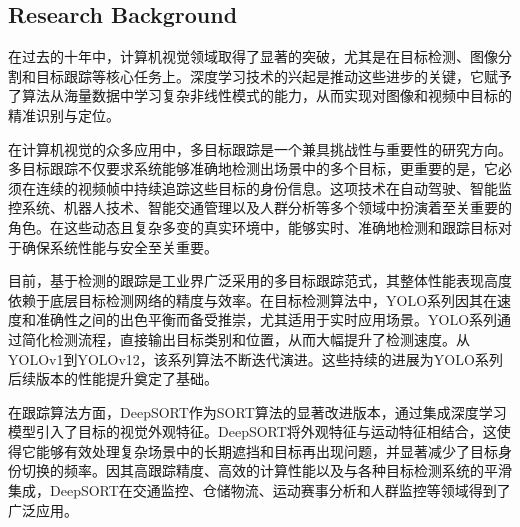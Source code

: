 
\subsection{Research Background}
在过去的十年中，计算机视觉领域取得了显著的突破，尤其是在目标检测、图像分割和目标跟踪等核心任务上。深度学习技术的兴起是推动这些进步的关键，它赋予了算法从海量数据中学习复杂非线性模式的能力，从而实现对图像和视频中目标的精准识别与定位\cite{113}\cite{28_kaur_comprehensive_2023}。

在计算机视觉的众多应用中，多目标跟踪是一个兼具挑战性与重要性的研究方向\cite{104}。多目标跟踪不仅要求系统能够准确地检测出场景中的多个目标，更重要的是，它必须在连续的视频帧中持续追踪这些目标的身份信息\cite{103}。这项技术在自动驾驶\cite{117}、智能监控系统\cite{59_wang_deep_2024}、机器人技术\cite{188}、智能交通管理\cite{144}以及人群分析\cite{158}等多个领域中扮演着至关重要的角色。在这些动态且复杂多变的真实环境中，能够实时、准确地检测和跟踪目标对于确保系统性能与安全至关重要。

目前，基于检测的跟踪是工业界广泛采用的多目标跟踪范式，其整体性能表现高度依赖于底层目标检测网络的精度与效率\cite{132}。在目标检测算法中，YOLO系列因其在速度和准确性之间的出色平衡而备受推崇，尤其适用于实时应用场景\cite{02_noauthor_review_nodate}\cite{141}。YOLO系列通过简化检测流程，直接输出目标类别和位置，从而大幅提升了检测速度。从YOLOv1到YOLOv12，该系列算法不断迭代演进。这些持续的进展为YOLO系列后续版本的性能提升奠定了基础。

在跟踪算法方面，DeepSORT作为SORT算法的显著改进版本，通过集成深度学习模型引入了目标的视觉外观特征。DeepSORT将外观特征与运动特征相结合，这使得它能够有效处理复杂场景中的长期遮挡和目标再出现问题，并显著减少了目标身份切换的频率\cite{211}。因其高跟踪精度、高效的计算性能以及与各种目标检测系统的平滑集成，DeepSORT在交通监控\cite{138}、仓储物流\cite{212}、运动赛事分析\cite{213}和人群监控\cite{120}等领域得到了广泛应用。

